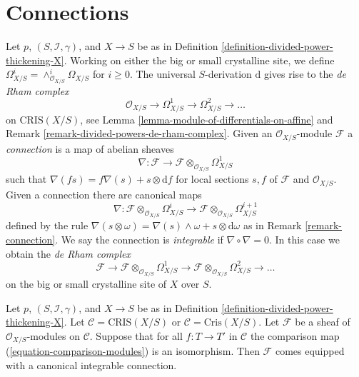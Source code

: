 \section{Connections}
\label{section-connections}

\noindent
Let $p$, $(S, \mathcal{I}, \gamma)$, and $X \to S$ be as in
Definition \ref{definition-divided-power-thickening-X}.
Working on either the big or small crystalline site, we define
$
\Omega^i_{X/S} = \wedge^i_{\mathcal{O}_{X/S}} \Omega_{X/S}
$
for $i \geq 0$. The universal $S$-derivation $\text{d}$ gives
rise to the {\it de Rham complex}
$$
\mathcal{O}_{X/S} \to \Omega^1_{X/S} \to \Omega^2_{X/S} \to \ldots
$$
on $\text{CRIS}(X/S)$, see
Lemma \ref{lemma-module-of-differentials-on-affine} and
Remark \ref{remark-divided-powers-de-rham-complex}.
Given an $\mathcal{O}_{X/S}$-module $\mathcal{F}$ a
{\it connection} is a map of abelian sheaves
$$
\nabla :
\mathcal{F}
\longrightarrow
\mathcal{F} \otimes_{\mathcal{O}_{X/S}} \Omega^1_{X/S}
$$
such that $\nabla(f s) = f\nabla(s) + s \otimes \text{d}f$
for local sections $s, f$ of $\mathcal{F}$ and $\mathcal{O}_{X/S}$.
Given a connection there are canonical maps
$$
\nabla :
\mathcal{F} \otimes_{\mathcal{O}_{X/S}} \Omega^i_{X/S}
\longrightarrow
\mathcal{F} \otimes_{\mathcal{O}_{X/S}} \Omega^{i + 1}_{X/S}
$$
defined by the rule $\nabla(s \otimes \omega) =
\nabla(s) \wedge \omega + s \otimes \text{d}\omega$
as in Remark \ref{remark-connection}. We say the connection is
{\it integrable} if $\nabla \circ \nabla = 0$. In this case we
obtain the {\it de Rham complex}
$$
\mathcal{F} \to
\mathcal{F} \otimes_{\mathcal{O}_{X/S}} \Omega^1_{X/S} \to
\mathcal{F} \otimes_{\mathcal{O}_{X/S}} \Omega^2_{X/S} \to \ldots
$$
on the big or small crystalline site of $X$ over $S$.

\begin{lemma}
\label{lemma-automatic-connection}
Let $p$, $(S, \mathcal{I}, \gamma)$, and $X \to S$ be as in
Definition \ref{definition-divided-power-thickening-X}.
Let $\mathcal{C} = \text{CRIS}(X/S)$ or $\mathcal{C} = \text{Cris}(X/S)$.
Let $\mathcal{F}$ be a sheaf of $\mathcal{O}_{X/S}$-modules
on $\mathcal{C}$. Suppose that for all $f : T \to T'$ in $\mathcal{C}$
the comparison map (\ref{equation-comparison-modules}) is an isomorphism.
Then $\mathcal{F}$ comes equipped with a canonical integrable connection.
\end{lemma}

